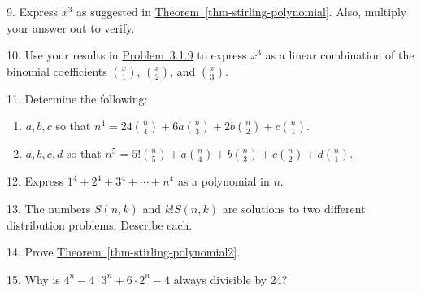 \documentclass[10pt,]{book}
\theoremstyle{plain}
\theoremstyle{definition}
\theoremstyle{definition}
\numberwithin{equation}{chapter}
\begin{document}
\begin{exerciselist}
\par\smallskip
\item[9.]\hypertarget{ex-stirling-cubic}{}\hypertarget{p-138}{}%
Express \(x^3\) as suggested in \hyperref[thm-stirling-polynomial]{Theorem~\ref{thm-stirling-polynomial}}.  Also, multiply your answer out to verify.%
\par\smallskip
\item[10.]\hypertarget{exercise-52}{}\hypertarget{p-139}{}%
Use your results in \hyperlink{ex-stirling-cubic}{Problem~3.1.9} to express \(x^3\) as a linear combination of the binomial coefficients \(\binom{x}{1}\), \(\binom{x}{2}\), and \(\binom{x}{3}\).%
\par\smallskip
\item[11.]\hypertarget{exercise-53}{}\hypertarget{p-140}{}%
Determine the following: \leavevmode%
\begin{enumerate}[label=(\alph*)]
\item\hypertarget{li-26}{}\hypertarget{p-141}{}%
\(a, b, c\) so that \(n^4 = 24\binom{n}{4} + 6a\binom{n}{3}+2b\binom{n}{2} + c \binom{n}{1}\).%
\item\hypertarget{li-27}{}\hypertarget{p-142}{}%
\(a, b, c, d\) so that \(n^5 = 5!\binom{n}{5} + a\binom{n}{4} + b\binom{n}{3} + c \binom{n}{2} + d \binom{n}{1}\).%
\end{enumerate}
%
\par\smallskip
\item[12.]\hypertarget{exercise-54}{}\hypertarget{p-143}{}%
Express \(1^4 + 2^4 + 3^4 + \cdots + n^4\) as a polynomial in \(n\).%
\par\smallskip
\item[13.]\hypertarget{exercise-55}{}\hypertarget{p-144}{}%
The numbers \(S(n,k)\) and \(k!S(n,k)\) are solutions to two different distribution problems.  Describe each.%
\par\smallskip
\item[14.]\hypertarget{exercise-56}{}\hypertarget{p-145}{}%
Prove \hyperref[thm-stirling-polynomial2]{Theorem~\ref{thm-stirling-polynomial2}}.%
\par\smallskip
\item[15.]\hypertarget{exercise-57}{}\hypertarget{p-146}{}%
Why is \(4^n - 4\cdot 3^n + 6\cdot 2^n - 4\) always divisible by 24?%
\par\smallskip
\end{exerciselist}
\typeout{************************************************}
\typeout{************************************************}
\end{document}
